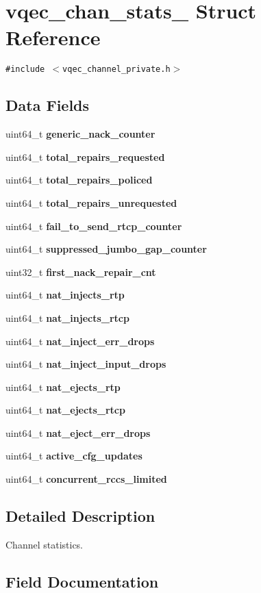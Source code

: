 \section{vqec\_\-chan\_\-stats\_\- Struct Reference}
\label{structvqec__chan__stats__}
{\tt \#include $<$vqec\_\-channel\_\-private.h$>$}

\subsection*{Data Fields}
\begin{CompactItemize}
\item 
uint64\_\-t \bf{generic\_\-nack\_\-counter}
\item 
uint64\_\-t \bf{total\_\-repairs\_\-requested}
\item 
uint64\_\-t \bf{total\_\-repairs\_\-policed}
\item 
uint64\_\-t \bf{total\_\-repairs\_\-unrequested}
\item 
uint64\_\-t \bf{fail\_\-to\_\-send\_\-rtcp\_\-counter}
\item 
uint64\_\-t \bf{suppressed\_\-jumbo\_\-gap\_\-counter}
\item 
uint32\_\-t \bf{first\_\-nack\_\-repair\_\-cnt}
\item 
uint64\_\-t \bf{nat\_\-injects\_\-rtp}
\item 
uint64\_\-t \bf{nat\_\-injects\_\-rtcp}
\item 
uint64\_\-t \bf{nat\_\-inject\_\-err\_\-drops}
\item 
uint64\_\-t \bf{nat\_\-inject\_\-input\_\-drops}
\item 
uint64\_\-t \bf{nat\_\-ejects\_\-rtp}
\item 
uint64\_\-t \bf{nat\_\-ejects\_\-rtcp}
\item 
uint64\_\-t \bf{nat\_\-eject\_\-err\_\-drops}
\item 
uint64\_\-t \bf{active\_\-cfg\_\-updates}
\item 
uint64\_\-t \bf{concurrent\_\-rccs\_\-limited}
\end{CompactItemize}


\subsection{Detailed Description}
Channel statistics. 



\subsection{Field Documentation}
